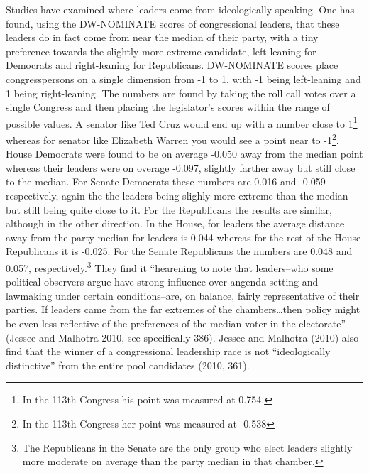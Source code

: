 \documentclass[12pt,twoside]{reedthesis}
\begin{document}
  Studies have examined where leaders come from ideologically speaking.
  One has found, using the DW-NOMINATE scores of congressional leaders,
  that these leaders do in fact come from near the median of their party,
  with a tiny preference towards the slightly more extreme candidate,
  left-leaning for Democrats and right-leaning for Republicans.
  DW-NOMINATE scores place congresspersons on a single dimension from -1
  to 1, with -1 being left-leaning and 1 being right-leaning. The numbers
  are found by taking the roll call votes over a single Congress and then
  placing the legislator's scores within the range of possible values. A
  senator like Ted Cruz would end up with a number close to 1\footnote{In
    the 113th Congress his point was measured at 0.754.} whereas for
  senator like Elizabeth Warren you would see a point near to -1\footnote{In
    the 113th Congress her point was measured at -0.538}. House Democrats
  were found to be on average -0.050 away from the median point whereas
  their leaders were on overage -0.097, slightly farther away but still
  close to the median. For Senate Democrats these numbers are 0.016 and
  -0.059 respectively, again the the leaders being slighly more extreme
  than the median but still being quite close to it. For the Republicans
  the results are similar, although in the other direction. In the House,
  for leaders the average distance away from the party median for leaders
  is 0.044 whereas for the rest of the House Republicans it is -0.025. For
  the Senate Republicans the numbers are 0.048 and 0.057,
  respectively.\footnote{The Republicans in the Senate are the only group
    who elect leaders slightly more moderate on average than the party
    median in that chamber.} They find it ``hearening to note that
  leaders--who some political observers argue have strong influence over
  angenda setting and lawmaking under certain conditions--are, on balance,
  fairly representative of their parties. If leaders came from the far
  extremes of the chambers\ldots{}then policy might be even less
  reflective of the preferences of the median voter in the electorate''
  (Jessee and Malhotra 2010, see specifically 386). Jessee and Malhotra
  (2010) also find that the winner of a congressional leadership race is
  not ``ideologically distinctive'' from the entire pool candidates (2010,
  361).
  
\end{document}
